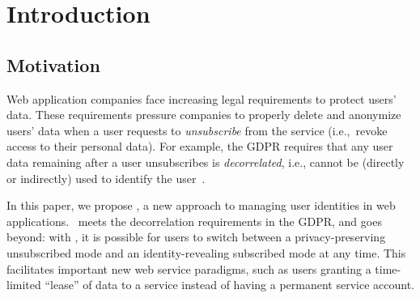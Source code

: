 \section{Introduction}

\subsection{Motivation} 

Web application companies face increasing legal requirements to protect users’ data. These
requirements pressure companies to properly delete and anonymize users' data when a user requests to
\emph{unsubscribe} from the service (i.e.,\ revoke access to their personal data).
For example, the GDPR requires that any user data remaining after a user unsubscribes is
\emph{decorrelated}, i.e., cannot be (directly or indirectly) used to identify the user~\cite{gdpr}.  

In this paper, we propose \sys, a new approach to managing user identities in web applications.
\sys~meets the decorrelation requirements in the GDPR, and goes beyond: with \sys, it is possible
for users to switch between a privacy-preserving unsubscribed mode and an identity-revealing
subscribed mode at any time. This facilitates important new web service paradigms, such as users
granting a time-limited ``lease'' of data to a service instead of having a permanent service account.


